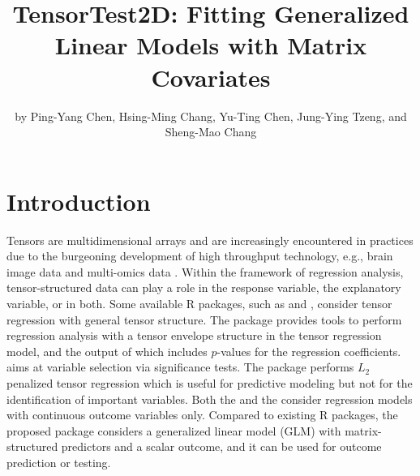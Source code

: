 \title{TensorTest2D: Fitting Generalized Linear Models with Matrix
Covariates}
\author{by Ping-Yang Chen, Hsing-Ming Chang, Yu-Ting Chen, Jung-Ying
Tzeng, and Sheng-Mao Chang}

\maketitle


\hypertarget{introduction}{%
\section{Introduction}\label{introduction}}

Tensors are multidimensional arrays and are increasingly encountered in
practices due to the burgeoning development of high throughput
technology, e.g., brain image data \citep{Zhou2013Tensor} and
multi-omics data \citep{ChangYang2021bioinformatics}. Within the
framework of regression analysis, tensor-structured data can play a role
in the response variable, the explanatory variable, or in both. Some
available R packages, such as  and
, consider tensor regression with general
tensor structure. The package  \citep{TRES2020} provides
tools to perform regression analysis with a tensor envelope structure in
the tensor regression model, and the output of which includes
\(p\)-values for the regression coefficients.  aims at
variable selection via significance tests. The package
 \citep{Lock2018Tensor,MWReg2019} performs
\(L_2\) penalized tensor regression which is useful for predictive
modeling but not for the identification of important variables. Both the
 and the  consider regression
models with continuous outcome variables only. Compared to existing R
packages, the proposed package 
\citep{chen2021TensorTest2D} considers a generalized linear model (GLM)
with matrix-structured predictors and a scalar outcome, and it can be
used for outcome prediction or testing.


